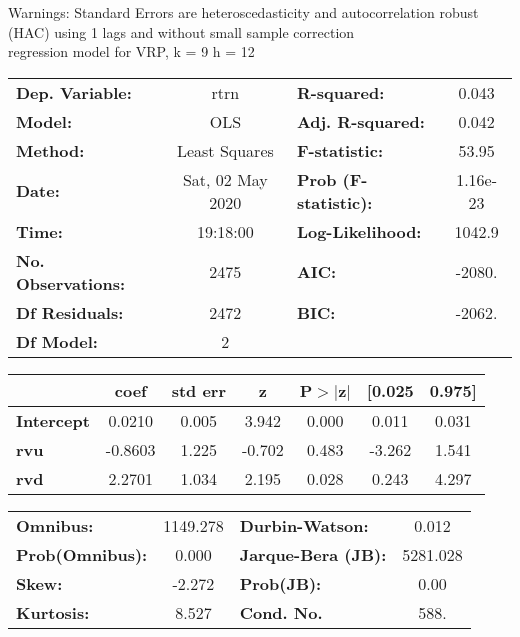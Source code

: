 Warnings: \newline
 [1] Standard Errors are heteroscedasticity and autocorrelation robust (HAC) using 1 lags and without small sample correction\\ 

regression model for VRP, k = 9 h = 12\begin{center}
\begin{tabular}{lclc}
\toprule
\textbf{Dep. Variable:}    &       rtrn       & \textbf{  R-squared:         } &     0.043   \\
\textbf{Model:}            &       OLS        & \textbf{  Adj. R-squared:    } &     0.042   \\
\textbf{Method:}           &  Least Squares   & \textbf{  F-statistic:       } &     53.95   \\
\textbf{Date:}             & Sat, 02 May 2020 & \textbf{  Prob (F-statistic):} &  1.16e-23   \\
\textbf{Time:}             &     19:18:00     & \textbf{  Log-Likelihood:    } &    1042.9   \\
\textbf{No. Observations:} &        2475      & \textbf{  AIC:               } &    -2080.   \\
\textbf{Df Residuals:}     &        2472      & \textbf{  BIC:               } &    -2062.   \\
\textbf{Df Model:}         &           2      & \textbf{                     } &             \\
\bottomrule
\end{tabular}
\begin{tabular}{lcccccc}
                   & \textbf{coef} & \textbf{std err} & \textbf{z} & \textbf{P$> |$z$|$} & \textbf{[0.025} & \textbf{0.975]}  \\
\midrule
\textbf{Intercept} &       0.0210  &        0.005     &     3.942  &         0.000        &        0.011    &        0.031     \\
\textbf{rvu}       &      -0.8603  &        1.225     &    -0.702  &         0.483        &       -3.262    &        1.541     \\
\textbf{rvd}       &       2.2701  &        1.034     &     2.195  &         0.028        &        0.243    &        4.297     \\
\bottomrule
\end{tabular}
\begin{tabular}{lclc}
\textbf{Omnibus:}       & 1149.278 & \textbf{  Durbin-Watson:     } &    0.012  \\
\textbf{Prob(Omnibus):} &   0.000  & \textbf{  Jarque-Bera (JB):  } & 5281.028  \\
\textbf{Skew:}          &  -2.272  & \textbf{  Prob(JB):          } &     0.00  \\
\textbf{Kurtosis:}      &   8.527  & \textbf{  Cond. No.          } &     588.  \\
\bottomrule
\end{tabular}
\end{center}

